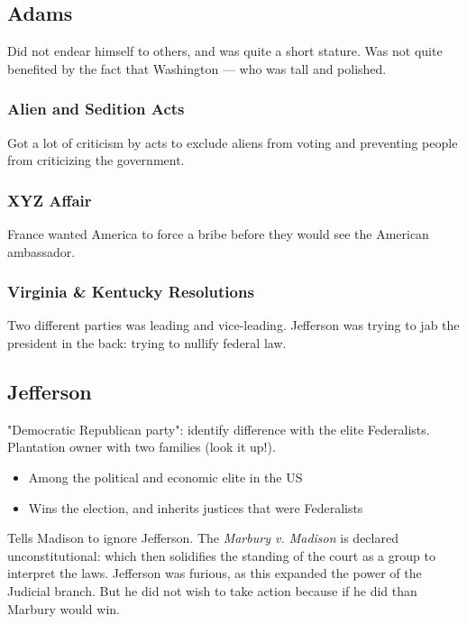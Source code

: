\documentclass[11pt]{article}
\begin{document}
\subsection{Adams}
\label{sec:org21458da}
Did not endear himself to others, and was quite a short stature. Was not quite benefited by the fact that Washington --- who was tall and polished.

\subsubsection{Alien and Sedition Acts}
\label{sec:org52e17bd}
Got a lot of criticism by acts to exclude aliens from voting and preventing people from criticizing the government.

\subsubsection{XYZ Affair}
\label{sec:orga94f5c3}
France wanted America to force a bribe before they would see the American ambassador.

\subsubsection{Virginia \& Kentucky Resolutions}
\label{sec:org2c76c21}
Two different parties was leading and vice-leading. Jefferson was trying to jab the president in the back: trying to nullify federal law.

\subsection{Jefferson}
\label{sec:org4c805e2}
"Democratic Republican party": identify difference with the elite Federalists. Plantation owner with two families (look it up!).

\begin{itemize}
\item Among the political and economic elite in the US
\item Wins the election, and inherits justices that were Federalists
\end{itemize}

Tells Madison to ignore Jefferson. The \emph{Marbury v. Madison} is declared unconstitutional: which then solidifies the standing of the court as a group to interpret the laws. Jefferson was furious, as this expanded the power of the Judicial branch. But he did not wish to take action because if he did than Marbury would win.
\end{document}

